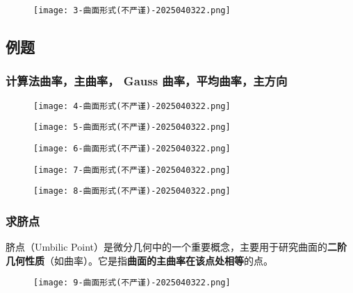 \begin{figure}[H]
\centering
\texttt{[image: 3-曲面形式(不严谨)-2025040322.png]}
\label{}
\end{figure}

\subsection{例题}

\subsubsection{计算法曲率，主曲率， Gauss 曲率，平均曲率，主方向}

\begin{figure}[H]
\centering
\texttt{[image: 4-曲面形式(不严谨)-2025040322.png]}
\label{}
\end{figure}

\begin{figure}[H]
\centering
\texttt{[image: 5-曲面形式(不严谨)-2025040322.png]}
\label{}
\end{figure}
\begin{figure}[H]
\centering
\texttt{[image: 6-曲面形式(不严谨)-2025040322.png]}
\label{}
\end{figure}
\begin{figure}[H]
\centering
\texttt{[image: 7-曲面形式(不严谨)-2025040322.png]}
\label{}
\end{figure}
\begin{figure}[H]
\centering
\texttt{[image: 8-曲面形式(不严谨)-2025040322.png]}
\label{}
\end{figure}

\subsubsection{求脐点}

脐点（Umbilic Point）是微分几何中的一个重要概念，主要用于研究曲面的\textbf{二阶几何性质}（如曲率）。它是指\textbf{曲面的主曲率在该点处相等}的点。

\begin{figure}[H]
\centering
\texttt{[image: 9-曲面形式(不严谨)-2025040322.png]}
\label{}
\end{figure}
